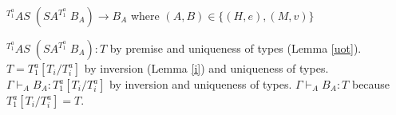 \begin{case}
$^{T_{1}^{a}}AS\;(SA^{T_{1}^{a}}\;B_{A})\rightarrow B_{A}$ where $(A,B)\in\lbrace(H,e),(M,v)\rbrace$

$^{T_{1}^{a}}AS\;(SA^{T_{1}^{a}}\;B_{A}):T$ by premise and uniqueness of types (Lemma \ref{uot}).  $T=T_{1}^{a}[T_{i}/T_{i}^{a}]$ by inversion (Lemma \ref{i}) and uniqueness of types.  $\Gamma\vdash_{A}B_{A}:T_{1}^{a}[T_{i}/T_{i}^{a}]$ by inversion and uniqueness of types.  $\Gamma\vdash_{A}B_{A}:T$ because $T_{1}^{a}[T_{i}/T_{i}^{a}]=T$.
\end{case}